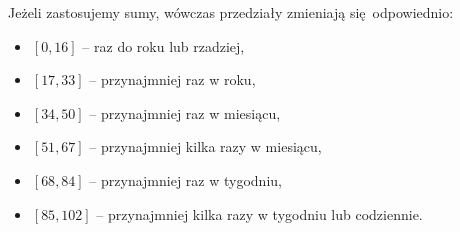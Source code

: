 Jeżeli zastosujemy sumy, wówczas przedziały zmieniają się odpowiednio:
\begin{itemize}
\item $[0, 16]$ -- raz do roku lub rzadziej,
\item $[17, 33]$ -- przynajmniej raz w roku,
\item $[34, 50]$ -- przynajmniej raz w miesiącu,
\item $[51, 67]$ -- przynajmniej kilka razy w miesiącu,
\item $[68, 84]$ -- przynajmniej raz w tygodniu,
\item $[85, 102]$ -- przynajmniej kilka razy w tygodniu lub codziennie. 
\end{itemize}
